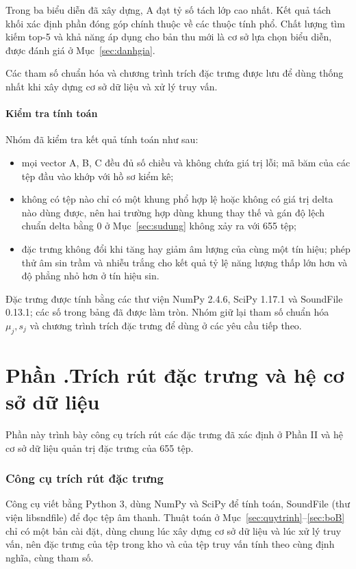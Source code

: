 \documentclass[11pt,a4paper]{article}
\newcommand{\phan}[1]{\clearpage\refstepcounter{part}\part*{Phần \thepart.\texorpdfstring{\enspace}{ }#1}}
\begin{document}
Trong ba biểu diễn đã xây dựng, A đạt tỷ số tách lớp cao nhất. Kết quả tách khối xác định phần đóng góp chính thuộc về các thuộc tính phổ. Chất lượng tìm kiếm top-5 và khả năng áp dụng cho bản thu mới là cơ sở lựa chọn biểu diễn, được đánh giá ở Mục~\ref{sec:danhgia}.

Các tham số chuẩn hóa và chương trình trích đặc trưng được lưu để dùng thống nhất khi xây dựng cơ sở dữ liệu và xử lý truy vấn.

\subsection{Kiểm tra tính toán}
Nhóm đã kiểm tra kết quả tính toán như sau:
\begin{itemize}
\item mọi vector A, B, C đều đủ số chiều và không chứa giá trị lỗi; mã băm của các tệp đầu vào khớp với hồ sơ kiểm kê;
\item không có tệp nào chỉ có một khung phổ hợp lệ hoặc không có giá trị delta nào dùng được, nên hai trường hợp dùng khung thay thế và gán độ lệch chuẩn delta bằng 0 ở Mục~\ref{sec:sudung} không xảy ra với 655 tệp;
\item đặc trưng không đổi khi tăng hay giảm âm lượng của cùng một tín hiệu; phép thử âm sin trầm và nhiễu trắng cho kết quả tỷ lệ năng lượng thấp lớn hơn và độ phẳng nhỏ hơn ở tín hiệu sin.
\end{itemize}

Đặc trưng được tính bằng các thư viện NumPy 2.4.6, SciPy 1.17.1 và SoundFile 0.13.1; các số trong bảng đã được làm tròn. Nhóm giữ lại tham số chuẩn hóa $\mu_j, s_j$ và chương trình trích đặc trưng để dùng ở các yêu cầu tiếp theo.
\clearpage

\phan{Trích rút đặc trưng và hệ cơ sở dữ liệu}
Phần này trình bày công cụ trích rút các đặc trưng đã xác định ở Phần II và hệ cơ sở dữ liệu quản trị đặc trưng của 655 tệp.

\section{Công cụ trích rút đặc trưng}\label{sec:congcu}
Công cụ viết bằng Python 3, dùng NumPy và SciPy để tính toán, SoundFile (thư viện libsndfile) để đọc tệp âm thanh. Thuật toán ở Mục~\ref{sec:quytrinh}--\ref{sec:boB} chỉ có một bản cài đặt, dùng chung lúc xây dựng cơ sở dữ liệu và lúc xử lý truy vấn, nên đặc trưng của tệp trong kho và của tệp truy vấn tính theo cùng định nghĩa, cùng tham số.
\end{document}

